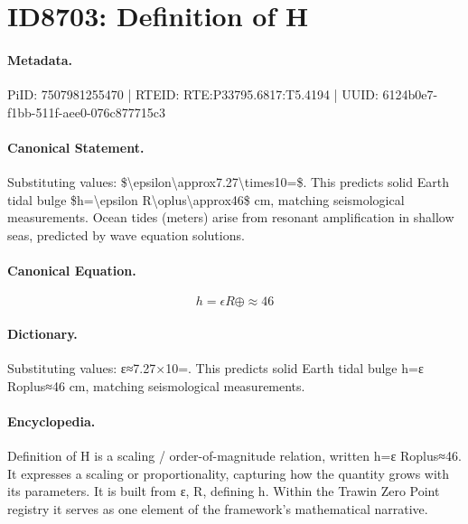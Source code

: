 \section*{ID8703: Definition of H}
\paragraph{Metadata.}
PiID: 7507981255470 | RTEID: RTE:P33795.6817:T5.4194 | UUID: 6124b0e7-f1bb-511f-aee0-076c877715c3

\paragraph{Canonical Statement.}
Substituting values: \$\textbackslash{}epsilon\textbackslash{}approx7.27\textbackslash{}times10=\$. This predicts solid Earth tidal bulge \$h=\textbackslash{}epsilon R\textbackslash{}oplus\textbackslash{}approx46\$ cm, matching seismological measurements. Ocean tides (meters) arise from resonant amplification in shallow seas, predicted by wave equation solutions.

\paragraph{Canonical Equation.}
\[
h=\epsilon R\oplus\approx46
\]

\paragraph{Dictionary.}
Substituting values: ε≈7.27×10=. This predicts solid Earth tidal bulge h=ε Roplus≈46 cm, matching seismological measurements.

\paragraph{Encyclopedia.}
Definition of H is a scaling / order-of-magnitude relation, written h=ε Roplus≈46. It expresses a scaling or proportionality, capturing how the quantity grows with its parameters. It is built from ε, R, defining h. Within the Trawin Zero Point registry it serves as one element of the framework's mathematical narrative.
